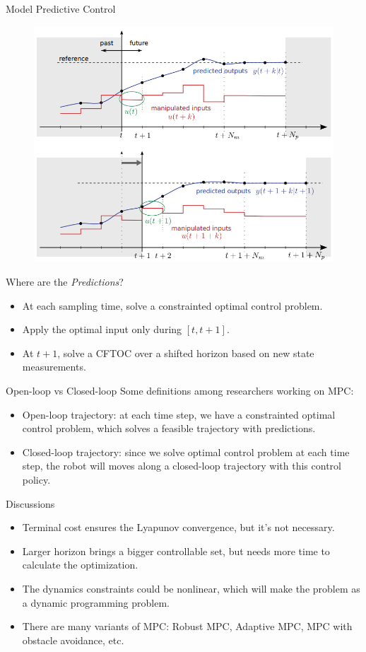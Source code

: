 \documentclass{beamer}
\begin{document}
\begin{frame}{Model Predictive Control}
	\begin{figure}
		\includegraphics[width=0.5\linewidth]{figures/mpc-prediction.png}
	\end{figure}
	Where are the \emph{Predictions}?
	\begin{itemize}
		\item At each sampling time, solve a constrainted optimal control problem.
		\item Apply the optimal input only during $[t, t+1]$.
		\item At $t + 1$, solve a CFTOC over a shifted horizon based on new state measurements.
	\end{itemize}
\end{frame}

\begin{frame}{Open-loop vs Closed-loop }
	Some definitions among researchers working on MPC:
	\begin{itemize}
		\item Open-loop trajectory: at each time step, we have a constrainted optimal control problem, which solves a feasible trajectory with predictions.
		\item Closed-loop trajectory: since we solve optimal control problem at each time step, the robot will moves along a closed-loop trajectory with this control policy.
	\end{itemize}
\end{frame}

\begin{frame}{Discussions}
	\begin{itemize}
		\item Terminal cost ensures the Lyapunov convergence, but it's not necessary.
		\item Larger horizon brings a bigger controllable set, but needs more time to calculate the optimization.
		\item The dynamics constraints could be nonlinear, which will make the problem as a dynamic programming problem.
		\item There are many variants of MPC: Robust MPC, Adaptive MPC, MPC with obstacle avoidance, etc.
	\end{itemize}
\end{frame}




\end{document}

